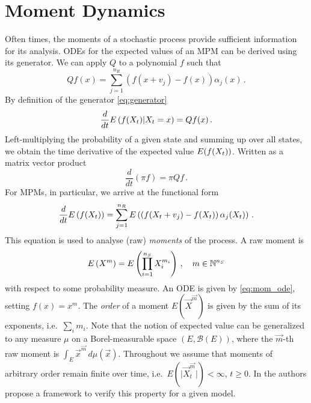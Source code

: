 \section{Moment Dynamics}\label{sec:moments_bg}
Often times, the moments of a stochastic process provide sufficient information for its analysis.
\acp{ODE} for the expected values of an \ac{MPM} can be derived using its generator.
We can apply $Q$ to a polynomial $f$ such that
\begin{equation}\label{eq:Qf}
    Qf(x) = \sum_{j=1}^{n_R}\left(f(x+v_j) - f(x)\right)\alpha_j(x)\,.
\end{equation}
By definition of the generator \eqref{eq:generator}
\[
    \frac{d}{dt}{E}\left(f(X_t)|X_t=x\right) = Qf(x)\,.
\]
Left-multiplying the probability of a given state and summing up over all states, we
obtain the time derivative of the expected value ${E}(f(X_t))$.
Written as a matrix vector product
\[
    \frac{d}{dt}(\pi f) = \pi Qf\,.
\]
For \acp{MPM}, in particular, we arrive at the functional form
\begin{equation}\label{eq:mom_ode}
    \frac{d}{dt}{E}\left(f({X}_t)\right) = \sum_{j=1}^{n_R}{E}\left(\left(f({X_t +
    v_j}) - f(X_t)\right)\alpha_j(X_t)\right)\,.
\end{equation}
This equation is used to analyse (raw) \emph{moments} of the process.
A raw moment is
\[{E}\left(X^{m}\right)={E}\left(\prod_{i=1}^{n_S} X_i^{m_i}\right)\,,\quad m\in {\mathbb{N}}^{n_S}\]
with respect to some probability measure.
An \ac{ODE} is given by \eqref{eq:mom_ode}, setting $f(x)=x^m$.
The \emph{order} of a moment $E({\vec X}^{\vec m})$ is given by the sum of its exponents,
i.e.\ $\sum_i m_i$.
Note that the notion of  expected value can be generalized
to any measure $\mu$ on a Borel-measurable space
$(E, \mathcal{B}(E))$, where
 the $\vec{m}$-th raw moment is $\int_E {\vec x}^{\vec m}\,d\mu(\vec x)$.
Throughout we assume that moments of arbitrary order remain finite over time,
i.e.\ $E(\lvert \vec{X}^{\vec{m}}_t\rvert)<\infty$, $t\geq 0$.
In \citet{gupta2014scalable} the authors propose a framework to verify
this property for a given model.

